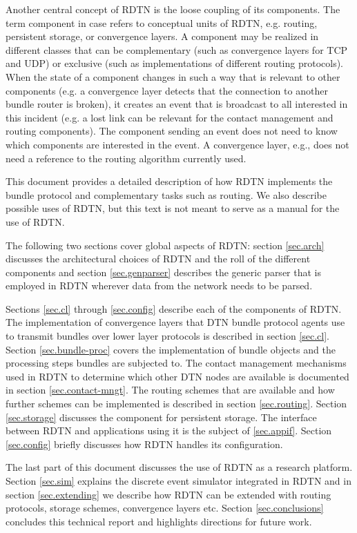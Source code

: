 \documentclass{article}
\begin{document}
Another central concept of RDTN is the loose coupling of its components. The
term component in case refers to conceptual units of RDTN, e.g.  routing,
persistent storage, or convergence layers. A component may be realized in
different classes that can be complementary (such as convergence layers for TCP
and UDP) or exclusive (such as implementations of different routing protocols).
When the state of a component changes in such a way that is relevant to other
components (e.g. a convergence layer detects that the connection to another
bundle router is broken), it creates an event that is broadcast to all
interested in this incident (e.g. a lost link can be relevant for the contact
management and routing components). The component sending an event does not need
to know which components are interested in the event. A convergence layer, e.g.,
does not need a reference to the routing algorithm currently used.

This document provides a detailed description of how RDTN implements the bundle
protocol and complementary tasks such as routing. We also describe possible uses
of RDTN, but this text is not meant to serve as a manual for the use of RDTN.

The following two sections cover global aspects of RDTN: section \ref{sec.arch}
discusses the architectural choices of RDTN and the roll of the different
components and section \ref{sec.genparser} describes the generic parser that is
employed in RDTN wherever data from the network needs to be parsed.

Sections \ref{sec.cl} through \ref{sec.config} describe each of the components
of RDTN.  The implementation of convergence layers that DTN bundle protocol
agents use to transmit bundles over lower layer protocols is described in
section \ref{sec.cl}. Section \ref{sec.bundle-proc} covers the implementation of
bundle objects and the processing steps bundles are subjected to. The contact
management mechanisms used in RDTN to determine which other DTN nodes are
available is documented in section \ref{sec.contact-mngt}. The routing schemes
that are available and how further schemes can be implemented is described in
section \ref{sec.routing}. Section \ref{sec.storage} discusses the component for
persistent storage. The interface between RDTN and applications using it is the
subject of \ref{sec.appif}. Section \ref{sec.config} briefly discusses how RDTN
handles its configuration.

The last part of this document discusses the use of RDTN as a research platform.
Section \ref{sec.sim} explains the discrete event simulator integrated in RDTN
and in section \ref{sec.extending} we describe how RDTN can be extended with
routing protocols, storage schemes, convergence layers etc. Section
\ref{sec.conclusions} concludes this technical report and highlights directions
for future work.
\end{document}
